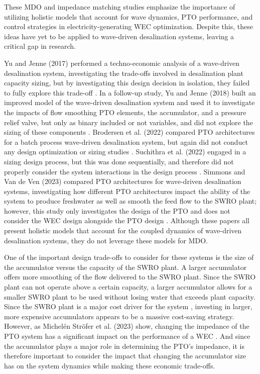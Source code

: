 \documentclass[a4paper,12pt]{elsarticle}
\begin{document}
These MDO and impedance matching studies emphasize the importance of utilizing holistic models that account for wave dynamics, PTO performance, and control strategies in electricity-generating WEC optimization. Despite this, these ideas have yet to be applied to wave-driven desalination systems, leaving a critical gap in research.

Yu and Jenne (2017) performed a techno-economic analysis of a wave-driven desalination system, investigating the trade-offs involved in desalination plant capacity sizing, but by investigating this design decision in isolation, they failed to fully explore this trade-off \cite{YJecon2017}. In a follow-up study, Yu and Jenne (2018) built an improved model of the wave-driven desalination system and used it to investigate the impacts of flow smoothing PTO elements, the accumulator, and a pressure relief valve, but only as binary included or not variables, and did not explore the sizing of these components \cite{Yu2018}. Brodersen et al. (2022) compared PTO architectures for a batch process wave-driven desalination system, but again did not conduct any design optimization or sizing studies \cite{brodersen2022}. Suchithra et al. (2022) engaged in a sizing design process, but this was done sequentially, and therefore did not properly consider the system interactions in the design process \cite{Suchithra2022}. Simmons and Van de Ven (2023) compared PTO architectures for wave-driven desalination systems, investigating how different PTO architectures impact the ability of the system to produce freshwater as well as smooth the feed flow to the SWRO plant; however, this study only investigates the design of the PTO and does not consider the WEC design alongside the PTO design \cite{Simmons2023}. Although these papers all present holistic models that account for the coupled dynamics of wave-driven desalination systems, they do not leverage these models for MDO.

One of the important design trade-offs to consider for these systems is the size of the accumulator versus the capacity of the SWRO plant. A larger accumulator offers more smoothing of the flow delivered to the SWRO plant. Since the SWRO plant can not operate above a certain capacity, a larger accumulator allows for a smaller SWRO plant to be used without losing water that exceeds plant capacity. Since the SWRO plant is a major cost driver for the system \cite{YJecon2017}, investing in larger, more expensive accumulators appears to be a massive cost-saving strategy. However, as Michelén Ströfer et al. (2023) show, changing the impedance of the PTO system has a significant impact on the performance of a WEC \cite{Stroefer2023}. And since the accumulator plays a major role in determining the PTO's impedance, it is therefore important to consider the impact that changing the accumulator size has on the system dynamics while making these economic trade-offs.
\end{document}
